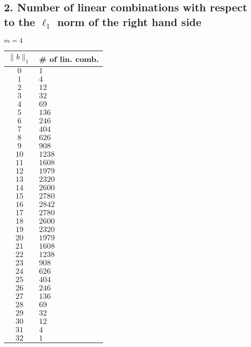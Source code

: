 \documentclass{article}
\newcommand\norm[1]{\lVert#1\rVert}
\begin{document}
\subsection*{2. \quad Number of linear combinations with respect to the $\ell_1$ norm of the right hand side}
\begin{minipage}{0.48\textwidth}
$m=4$
\small
\vspace{12pt}

    \begin{tabular}{c|l}
$\norm{b}_1$ & {\# of lin. comb.}  \\
\hline
$0$ & $1$ \\
$1$ & $4$ \\
$2$ & $12$ \\
$3$ & $32$ \\
$4$ & $69$ \\
$5$ & $136$ \\
$6$ & $246$ \\
$7$ & $404$ \\
$8$ & $626$ \\
$9$ & $908$ \\
$10$ & $1238$ \\
$11$ & $1608$ \\
$12$ & $1979$ \\
$13$ & $2320$ \\
$14$ & $2600$ \\
$15$ & $2780$ \\
$16$ & $2842$ \\
$17$ & $2780$ \\
$18$ & $2600$ \\
$19$ & $2320$ \\
$20$ & $1979$ \\
$21$ & $1608$ \\
$22$ & $1238$ \\
$23$ & $908$ \\
$24$ & $626$ \\
$25$ & $404$ \\
$26$ & $246$ \\
$27$ & $136$ \\
$28$ & $69$ \\
$29$ & $32$ \\
$30$ & $12$ \\
$31$ & $4$ \\
$32$ & $1$ 
    \end{tabular}
    \vspace{88pt}
\end{minipage}
    \hfill
\end{document}
